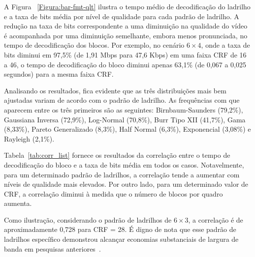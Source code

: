 A Figura ~\ref{Figura:bar-fmt-qlt} ilustra o tempo médio de decodificação do ladrilho e a taxa de bits média por nível de qualidade para cada padrão de ladrilho. A redução na taxa de bits correspondente a uma diminuição na qualidade do vídeo é acompanhada por uma diminuição semelhante, embora menos pronunciada, no tempo de decodificação dos blocos. Por exemplo, no cenário $6 \times 4$, onde a taxa de bits diminui em 97,5\% (de 1,91 Mbps para 47,6 Kbps) em uma faixa CRF de 16 a 46, o tempo de decodificação do bloco diminui apenas 63,1\% (de 0,067 a 0,025 segundos) para a mesma faixa CRF.

Analisando os resultados, fica evidente que as três distribuições mais bem ajustadas variam de acordo com o padrão de ladrilho. As frequências com que aparecem entre os três primeiros são as seguintes: Birnbaum-Saunders (79,2\%), Gaussiana Inversa (72,9\%), Log-Normal (70,8\%), Burr Tipo XII (41,7\%), Gama (8,33\%), Pareto Generalizado (8,3\%), Half Normal (6,3\%), Exponencial (3,08\%) e Rayleigh (2,1\%).


Tabela~\ref{tab:corr_list} fornece os resultados da correlação entre o tempo de decodificação do bloco e a taxa de bits média em todos os casos. Notavelmente, para um determinado padrão de ladrilhos, a correlação tende a aumentar com níveis de qualidade mais elevados. Por outro lado, para um determinado valor de CRF, a correlação diminui à medida que o número de blocos por quadro aumenta.

Como ilustração, considerando o padrão de ladrilhos de $6 \times 3$, a correlação é de aproximadamente 0,728 para CRF = 28. É digno de nota que esse padrão de ladrilhos específico demonstrou alcançar economias substanciais de largura de banda em pesquisas anteriores~\cite{Graf2017}.

